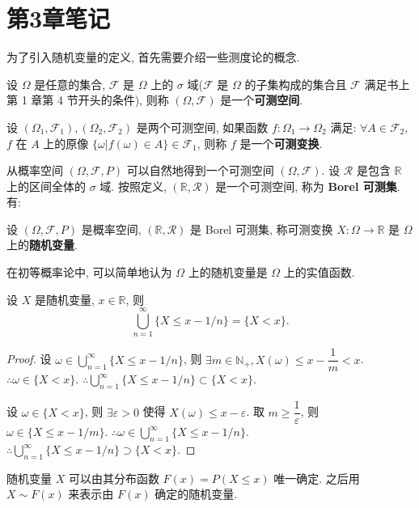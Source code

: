 \documentclass{ctexart}
\begin{document}
\section{第3章笔记}
为了引入随机变量的定义, 首先需要介绍一些测度论的概念.
\begin{definition}
    设 $\Omega$ 是任意的集合, $\mathcal{F}$ 是 $\Omega$ 上的 $\sigma$ 域($\mathcal{F}$ 是 $\Omega$ 的子集构成的集合且 $\mathcal{F}$ 满足书上第 1 章第 4 节开头的条件), 则称 $(\Omega,\mathcal{F})$ 是一个\textbf{可测空间}.
\end{definition}
\begin{definition}
    设 $(\Omega_1,\mathcal{F}_1),(\Omega_2,\mathcal{F}_2)$ 是两个可测空间, 如果函数 $f:\Omega_1\to\Omega_2$ 满足: $\forall A\in\mathcal{F}_2$, $f$ 在 $A$ 上的原像 $\{\omega|f(\omega)\in A\}\in\mathcal{F}_1$, 则称 $f$ 是一个\textbf{可测变换}.
\end{definition}

从概率空间 $(\Omega,\mathcal{F},P)$ 可以自然地得到一个可测空间 $(\Omega,\mathcal{F})$. 设 $\mathcal{R}$ 是包含 $\mathbb{R}$ 上的区间全体的 $\sigma$ 域. 按照定义, $(\mathbb{R},\mathcal{R})$ 是一个可测空间, 称为 \textbf{Borel 可测集}. 有:
\begin{definition}
    设 $(\Omega,\mathcal{F},P)$ 是概率空间, $(\mathbb{R},\mathcal{R})$ 是 Borel 可测集, 称可测变换 $X:\Omega\to\mathbb{R}$ 是 $\Omega$ 上的\textbf{随机变量}.
\end{definition}

在初等概率论中, 可以简单地认为 $\Omega$ 上的随机变量是 $\Omega$ 上的实值函数.
\begin{example}[书上的例 1.3(2)]
    设 $X$ 是随机变量, $x\in\mathbb{R}$, 则
    \[\bigcup\limits_{n=1}^\infty\{X\leq x-1/n\}=\{X<x\}.\]
\end{example}
\begin{proof}
    设 $\omega\in\bigcup\limits_{n=1}^\infty\{X\leq x-1/n\}$, 则 $\exists m\in\mathbb{N}_+,X(\omega)\leq x-\dfrac{1}{m}<x$. $\therefore\omega\in\{X<x\}$. $\therefore\bigcup\limits_{n=1}^\infty\{X\leq x-1/n\}\subset\{X<x\}$.

    设 $\omega\in\{X<x\}$, 则 $\exists\varepsilon>0$ 使得 $X(\omega)\leq x-\varepsilon$. 取 $m\geq\dfrac{1}{\varepsilon}$, 则 $\omega\in\{X\leq x-1/m\}$. $\therefore\omega\in\bigcup\limits_{n=1}^\infty\{X\leq x-1/n\}$. $\therefore\bigcup\limits_{n=1}^\infty\{X\leq x-1/n\}\supset\{X<x\}$.
\end{proof}

随机变量 $X$ 可以由其分布函数 $F(x)=P(X\leq x)$ 唯一确定. 之后用 $X\sim F(x)$ 来表示由 $F(x)$ 确定的随机变量.
\end{document}
